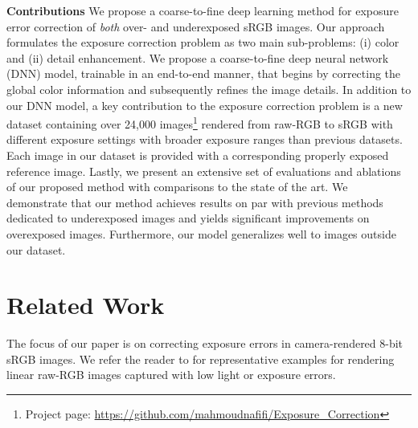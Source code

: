 \documentclass[final]{cvpr}
\begin{document}
\noindent\textbf{Contributions }
We propose a coarse-to-fine deep learning method for exposure error correction of \textit{both} over- and underexposed sRGB images. Our approach formulates the exposure correction problem as two main sub-problems: (i) color and (ii) detail enhancement. We propose a coarse-to-fine deep
neural network (DNN) model, trainable in an end-to-end manner, that
begins by correcting the global color information and subsequently refines the image details.
In addition to our DNN model, a key contribution to the exposure correction problem is a new dataset containing over 24,000 images\footnote{Project page: \href{https://github.com/mahmoudnafifi/Exposure_Correction}{https://github.com/mahmoudnafifi/Exposure\_Correction}} rendered from raw-RGB to sRGB with different exposure settings with broader exposure ranges than previous datasets. Each image in our dataset is provided with a corresponding properly exposed reference image. Lastly, we present an extensive set of evaluations and ablations of our proposed method with comparisons to the state of the art.  We demonstrate that our method achieves results on par with previous methods dedicated to underexposed images and yields significant improvements on overexposed images. Furthermore, our model generalizes well to images outside our dataset. 




\section{Related Work}
\label{sec:relatedwork}
The focus of our paper is on correcting exposure errors in camera-rendered 8-bit sRGB images. We refer the reader to \cite{chen2018learning, hu2018exposure, hasinoff2016burst, liba2019handheld} for representative examples for rendering linear raw-RGB images captured with low light or exposure errors.
\end{document}
